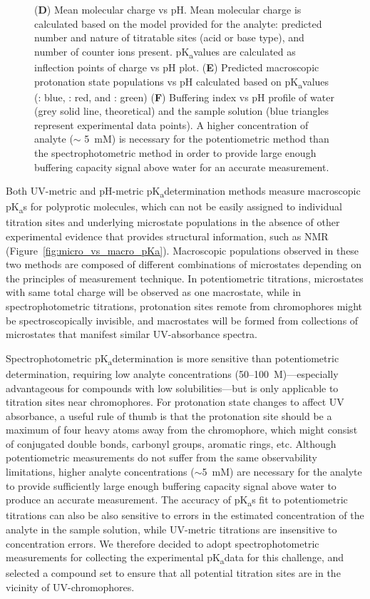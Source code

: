\documentclass[9pt,lineno]{elife}
\newcommand{\pKa}{pK\textsubscript{a}}
\begin{document}
\begin{figure}
{(\textbf{D}) Mean molecular charge vs pH. 
Mean molecular charge is calculated based on the model provided for the analyte: predicted number and nature of titratable sites (acid or base type), and number of counter ions present. \pKa values are calculated as inflection points of charge vs pH plot. 
(\textbf{E}) Predicted macroscopic protonation state populations vs pH calculated based on \pKa values (: blue, : red, and : green) 
(\textbf{F}) Buffering index vs pH profile of water (grey solid line, theoretical) and the sample solution (blue triangles represent experimental data points). 
A higher concentration of analyte ($\sim$ 5~mM) is necessary for the potentiometric method than the spectrophotometric method in order to provide large enough buffering capacity signal above water for an accurate measurement. 
}
\label{fig:UVmetric_vs_pHmetric_pKa}
\end{figure}

Both UV-metric and pH-metric \pKa determination methods measure macroscopic \pKa s for polyprotic molecules, which can not be easily assigned to individual titration sites and underlying microstate populations in the absence of other experimental evidence that provides structural information, such as NMR (Figure~\ref{fig:micro_vs_macro_pKa}). Macroscopic populations observed in these two methods are composed of different combinations of microstates depending on the principles of measurement technique. 
In potentiometric titrations, microstates with same total charge will be observed as one macrostate, while in spectrophotometric titrations, protonation sites remote from chromophores might be spectroscopically invisible, and macrostates will be formed from collections of microstates that manifest similar UV-absorbance spectra.

Spectrophotometric \pKa determination is more sensitive than potentiometric determination, requiring low analyte concentrations (50--100~{\micro}M)---especially advantageous for compounds with low solubilities---but is only applicable to titration sites near chromophores. 
For protonation state changes to affect UV absorbance, a useful rule of thumb is that the protonation site should be a maximum of four heavy atoms away from the chromophore, which might consist of conjugated double bonds, carbonyl groups, aromatic rings, etc.
Although potentiometric measurements do not suffer from the same observability limitations, higher analyte concentrations ($\sim$5~mM) are necessary for the analyte to provide sufficiently large enough buffering capacity signal above water to produce an accurate measurement. 
The accuracy of \pKa s fit to potentiometric titrations can also be also sensitive to errors in the estimated concentration of the analyte in the sample solution, while UV-metric titrations are insensitive to concentration errors.
We therefore decided to adopt spectrophotometric measurements for collecting the experimental \pKa data for this challenge, and selected a compound set to ensure that all potential titration sites are in the vicinity of UV-chromophores.
\end{document}
